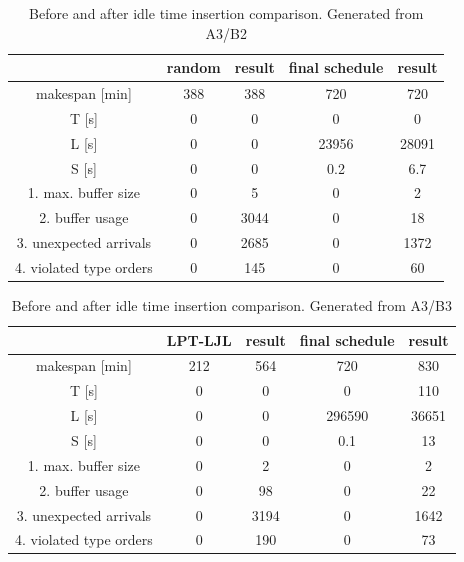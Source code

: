 \documentclass{ctuthesis}
\begin{document}
\begin{table}[H]
\begin{tabular}{ |c|| c | c | c | c |} 
\hline
 & random & result & final schedule & result \\ 
\hline
makespan [min] & 388 & 388 & 720 & 720 \\
\hline
T [s]& 0 & 0 & 0 & 0 \\
\hline
L [s]& 0 & 0 & 23956 &  28091 \\
\hline
S [s]& 0 & 0 & 0.2 & 6.7\\
\hline
1. max. buffer size & 0 & 5 & 0 & 2\\ 
\hline
2. buffer usage  & 0 & 3044 & 0 & 18\\ 
\hline
3. unexpected arrivals & 0 & 2685 & 0 & 1372\\ 
\hline
4. violated type orders & 0 & 145 & 0 & 60\\ 
\hline
\end{tabular}
\caption{Before and after idle time insertion comparison. Generated from A3/B2}
\end{table}



\begin{table}[H]
\begin{tabular}{ |c|| c | c | c | c |} 
\hline
 & LPT-LJL & result & final schedule & result \\ 
\hline
makespan [min] & 212 & 564 & 720 & 830 \\
\hline
T [s]& 0 & 0 & 0 & 110 \\
\hline
L [s]& 0 & 0 & 296590 & 36651 \\
\hline
S [s]& 0 & 0 & 0.1 & 13 \\
\hline
1. max. buffer size & 0 & 2 & 0 & 2\\ 
\hline
2. buffer usage  & 0 & 98 & 0 & 22\\ 
\hline
3. unexpected arrivals & 0 & 3194 & 0 & 1642\\ 
\hline
4. violated type orders & 0 & 190 & 0 & 73\\ 
\hline
\end{tabular}
\caption{Before and after idle time insertion comparison. Generated from A3/B3}
\end{table}
\end{document}
